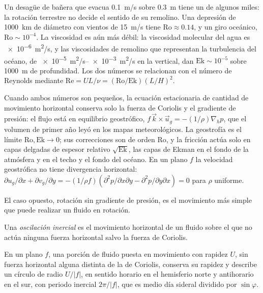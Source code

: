 Un desagüe de bañera que evacua \qty{0.1}{m/s} sobre \qty{0.3}{m} tiene un  de
algunos miles: la rotación terrestre no decide el sentido de su remolino. Una depresión de
\qty{1000}{km} de diámetro con vientos de \qty{15}{m/s} tiene
$\mathrm{Ro} \approx 0.14$, y un giro oceánico, $\mathrm{Ro} \sim 10^{-4}$.
La viscosidad es aún más débil: la viscosidad molecular del agua es
\qty{e-6}{m^2/s}, y las viscosidades de remolino que representan la turbulencia
del océano, de \qtyrange{e-5}{e-3}{m^2/s} en la vertical, dan
$\mathrm{Ek} \sim 10^{-5}$ sobre \qty{1000}{m} de profundidad. Los dos números se
relacionan con el número de Reynolds mediante $\mathrm{Re} = UL/\nu =
(\mathrm{Ro}/\mathrm{Ek})(L/H)^2$.

Cuando ambos números son pequeños, la ecuación estacionaria de cantidad de movimiento horizontal conserva
solo la fuerza de Coriolis y el gradiente de presión: el flujo está en
equilibrio geostrófico, $f\,\vec k\times\vec u_g = -(1/\rho)\nabla_h p$, que
el volumen de primer año leyó en los mapas meteorológicos. La geostrofía es el límite
$\mathrm{Ro}, \mathrm{Ek}\to 0$; sus correcciones son de orden
$\mathrm{Ro}$, y la fricción actúa solo en capas delgadas de espesor relativo
$\sqrt{\mathrm{Ek}}$, las capas de Ekman en el fondo de la atmósfera y
en el techo y el fondo del océano. En un plano $f$ la velocidad geostrófica
no tiene divergencia horizontal: $\partial u_g/\partial x + \partial
v_g/\partial y = -(1/\rho f)(\partial^2 p/\partial x\partial y -
\partial^2 p/\partial y\partial x) = 0$ para $\rho$ uniforme.

El caso opuesto, rotación sin gradiente de presión, es el movimiento más simple
que puede realizar un fluido en rotación.

\begin{definition}\label{def:b3:gfd-foundations:inertial}
Una \emph{oscilación inercial} es el
movimiento horizontal de un fluido sobre el que no actúa ninguna fuerza horizontal salvo la
fuerza de Coriolis.
\end{definition}

\begin{theorem}\label{thm:b3:gfd-foundations:inertial}
En un plano $f$, una porción de fluido puesta en movimiento con rapidez $U$, sin fuerza horizontal
alguna distinta de la de Coriolis, conserva su rapidez y describe un círculo de radio
$U/|f|$, en sentido horario en el hemisferio norte y antihorario en el
sur, con periodo inercial $2\pi/|f|$, que es medio día sideral
dividido por $\sin\varphi$.
\end{theorem}

